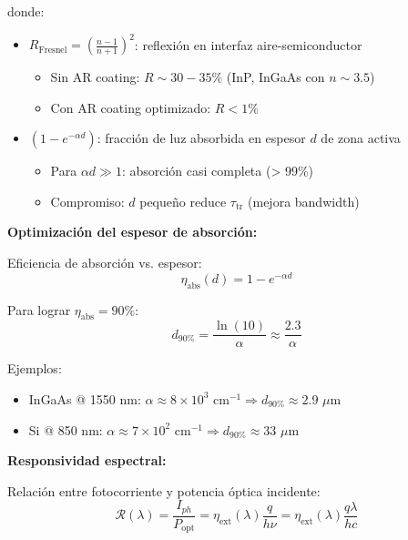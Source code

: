 \documentclass[11pt,a4paper]{article}
\begin{document}
donde:
\begin{itemize}
    \item $R_{\text{Fresnel}} = \left(\frac{n-1}{n+1}\right)^2$: reflexión en interfaz aire-semiconductor
    \begin{itemize}
        \item Sin AR coating: $R \sim 30-35\%$ (InP, InGaAs con $n \sim 3.5$)
        \item Con AR coating optimizado: $R < 1\%$
    \end{itemize}
    
    \item $(1 - e^{-\alpha d})$: fracción de luz absorbida en espesor $d$ de zona activa
    \begin{itemize}
        \item Para $\alpha d \gg 1$: absorción casi completa (> 99\%)
        \item Compromiso: $d$ pequeño reduce $\tau_{\text{tr}}$ (mejora bandwidth)
    \end{itemize}
\end{itemize}

\textbf{Optimización del espesor de absorción:}

Eficiencia de absorción vs. espesor:
\begin{equation}
    \eta_{\text{abs}}(d) = 1 - e^{-\alpha d}
\end{equation}

Para lograr $\eta_{\text{abs}} = 90\%$:
\begin{equation}
    d_{90\%} = \frac{\ln(10)}{\alpha} \approx \frac{2.3}{\alpha}
\end{equation}

Ejemplos:
\begin{itemize}
    \item InGaAs @ 1550 nm: $\alpha \approx 8 \times 10^3$ cm$^{-1} \Rightarrow d_{90\%} \approx 2.9$ $\mu$m
    \item Si @ 850 nm: $\alpha \approx 7 \times 10^2$ cm$^{-1} \Rightarrow d_{90\%} \approx 33$ $\mu$m
\end{itemize}

\textbf{Responsividad espectral:}

Relación entre fotocorriente y potencia óptica incidente:
\begin{equation}
    \mathcal{R}(\lambda) = \frac{I_{ph}}{P_{\text{opt}}} = \eta_{\text{ext}}(\lambda)\frac{q}{h\nu} = \eta_{\text{ext}}(\lambda)\frac{q\lambda}{hc}
\end{equation}
\end{document}
